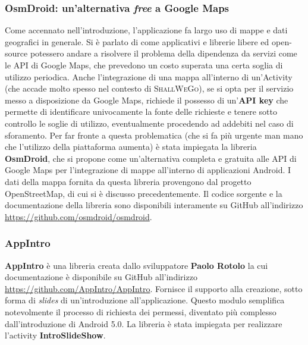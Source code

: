                 \subsubsection{OsmDroid: un'alternativa \textit{free} a Google Maps}
                    Come accennato nell'introduzione, l'applicazione fa largo uso di mappe e dati geografici in generale. Si è parlato di come applicativi e librerie libere ed open-source potessero andare a risolvere il problema della dipendenza da servizi come le API di Google Maps, che prevedono un costo superata una certa soglia di utilizzo periodica. Anche l'integrazione di una mappa all'interno di un'Activity (che accade molto spesso nel contesto di \textsc{ShallWeGo}), se si opta per il servizio messo a disposizione da Google Maps, richiede il possesso di un'\textbf{API key} che permette di identificare univocamente la fonte delle richieste e tenere sotto controllo le soglie di utilizzo, eventualmente procedendo ad addebiti nel caso di sforamento. Per far fronte a questa problematica (che si fa più urgente man mano che l'utilizzo della piattaforma aumenta) è stata impiegata la libreria \textbf{OsmDroid}, che si propone come un'alternativa completa e gratuita alle API di Google Maps per l'integrazione di mappe all'interno di applicazioni Android. I dati della mappa fornita da questa libreria provengono dal progetto OpenStreetMap, di cui si è discusso precedentemente. Il codice sorgente e la documentazione della libreria sono disponibili interamente su GitHub all'indirizzo \url{https://github.com/osmdroid/osmdroid}.

                \subsubsection{AppIntro}
                    \textbf{AppIntro} è una libreria creata dallo sviluppatore \textbf{Paolo Rotolo} la cui documentazione è disponibile su GitHub all'indirizzo \url{https://github.com/AppIntro/AppIntro}. Fornisce il supporto alla creazione, sotto forma di \textit{slides} di un'introduzione all'applicazione. Questo modulo semplifica notevolmente il processo di richiesta dei permessi, diventato più complesso dall'introduzione di Android 5.0.
                    La libreria è stata impiegata per realizzare l'activity \textbf{IntroSlideShow}.

